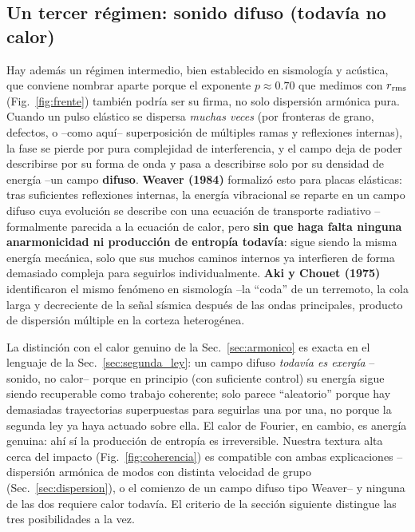 \documentclass[11pt,a4paper]{article}
\begin{document}
\subsection{Un tercer régimen: sonido difuso (todavía no calor)}
\label{sec:sonido_difuso}

Hay además un régimen intermedio, bien establecido en sismología y
acústica, que conviene nombrar aparte porque el exponente $p\approx0.70$
que medimos con $r_{\rm rms}$ (Fig.~\ref{fig:frente}) también podría ser
su firma, no solo dispersión armónica pura. Cuando un pulso elástico se
dispersa \emph{muchas veces} (por fronteras de grano, defectos, o --como
aquí-- superposición de múltiples ramas y reflexiones internas), la fase
se pierde por pura complejidad de interferencia, y el campo deja de poder
describirse por su forma de onda y pasa a describirse solo por su densidad
de energía --un campo \textbf{difuso}. \textbf{Weaver (1984)}
\cite{Weaver1984} formalizó esto para placas elásticas: tras suficientes
reflexiones internas, la energía vibracional se reparte en un campo difuso
cuya evolución se describe con una ecuación de transporte radiativo
--formalmente parecida a la ecuación de calor, pero \textbf{sin que haga
falta ninguna anarmonicidad ni producción de entropía todavía}: sigue
siendo la misma energía mecánica, solo que sus muchos caminos internos ya
interfieren de forma demasiado compleja para seguirlos individualmente.
\textbf{Aki y Chouet (1975)} \cite{AkiChouet1975} identificaron el mismo
fenómeno en sismología --la ``coda'' de un terremoto, la cola larga y
decreciente de la señal sísmica después de las ondas principales, producto
de dispersión múltiple en la corteza heterogénea.

La distinción con el calor genuino de la Sec.~\ref{sec:armonico} es exacta
en el lenguaje de la Sec.~\ref{sec:segunda_ley}: un campo difuso
\emph{todavía es exergía} --sonido, no calor-- porque en principio (con
suficiente control) su energía sigue siendo recuperable como trabajo
coherente; solo parece ``aleatorio'' porque hay demasiadas trayectorias
superpuestas para seguirlas una por una, no porque la segunda ley ya haya
actuado sobre ella. El calor de Fourier, en cambio, es anergía genuina: ahí
sí la producción de entropía es irreversible. Nuestra textura alta cerca
del impacto (Fig.~\ref{fig:coherencia}) es compatible con ambas
explicaciones --dispersión armónica de modos con distinta velocidad de
grupo (Sec.~\ref{sec:dispersion}), o el comienzo de un campo difuso tipo
Weaver-- y ninguna de las dos requiere calor todavía. El criterio de la
sección siguiente distingue las tres posibilidades a la vez.
\end{document}

